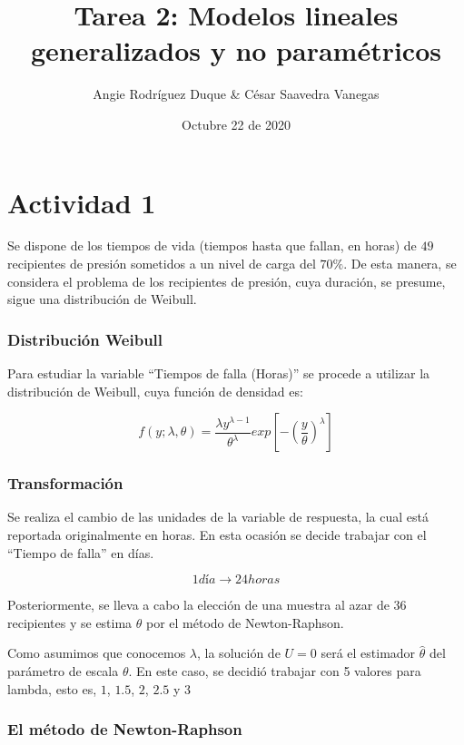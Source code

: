 \documentclass[
]{article}
\title{Tarea 2: Modelos lineales generalizados y no paramétricos}
\author{Angie Rodríguez Duque \& César Saavedra Vanegas}
\date{Octubre 22 de 2020}
\begin{document}
\maketitle

\hypertarget{actividad-1}{%
\section{Actividad 1}\label{actividad-1}}

Se dispone de los tiempos de vida (tiempos hasta que fallan, en horas)
de \(49\) recipientes de presión sometidos a un nivel de carga del
\(70\%\). De esta manera, se considera el problema de los recipientes de
presión, cuya duración, se presume, sigue una distribución de Weibull.

\hypertarget{distribuciuxf3n-weibull}{%
\subsubsection{Distribución Weibull}\label{distribuciuxf3n-weibull}}

Para estudiar la variable ``Tiempos de falla (Horas)'' se procede a
utilizar la distribución de Weibull, cuya función de densidad es:

\[f(y;\lambda,\theta)=\displaystyle\frac{\lambda y^{\lambda-1}}{\theta^{\lambda}}exp \left[-\left(\frac{y}{\theta}\right)^{\lambda}\right]\]

\hypertarget{transformaciuxf3n}{%
\subsubsection{Transformación}\label{transformaciuxf3n}}

Se realiza el cambio de las unidades de la variable de respuesta, la
cual está reportada originalmente en horas. En esta ocasión se decide
trabajar con el ``Tiempo de falla'' en días.

\[1 día\longrightarrow 24 horas\]

Posteriormente, se lleva a cabo la elección de una muestra al azar de
\(36\) recipientes y se estima \(\theta\) por el método de
Newton-Raphson.

Como asumimos que conocemos \(\lambda\), la solución de \(U=0\) será el
estimador \(\hat{\theta}\) del parámetro de escala \(\theta\). En este
caso, se decidió trabajar con 5 valores para lambda, esto es, \(1\),
\(1.5\), \(2\), \(2.5\) y \(3\)

\hypertarget{el-muxe9todo-de-newton-raphson}{%
\subsubsection{El método de
Newton-Raphson}\label{el-muxe9todo-de-newton-raphson}}
\end{document}
